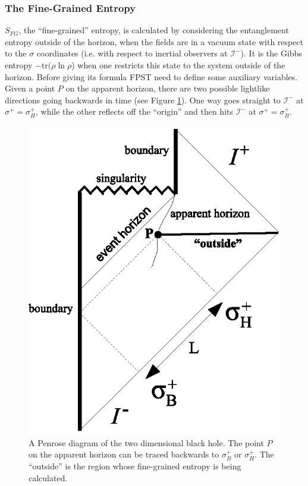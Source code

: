 \documentclass[12pt]{article}
\begin{document}
\subsubsection{The Fine-Grained Entropy}

$S_{FG}$, the ``fine-grained'' entropy, is calculated by considering the entanglement entropy outside of the horizon, when the fields are in a vacuum state with respect to the $\sigma$ coordinates (i.e. with respect to inertial observers at $\mathcal{I}^{-}$).  It is the Gibbs entropy $-\mathrm{tr}(\rho\ln \rho$) when one restricts this state to the system outside of the horizon.  Before giving its formula FPST need to define some auxiliary variables.  Given a point $P$ on the apparent horizon, there are two possible lightlike directions going backwards in time (see Figure \ref{2Dfig}).  One way goes straight to $\mathcal{I}^{-}$ at $\sigma^{+} = \sigma^{+}_H$, while the other reflects off the ``origin'' and then hits $\mathcal{I}^{-}$ at $\sigma^{+} = \sigma^{+}_B$.
\begin{figure}[ht]
\centering
\includegraphics{2d.eps}
\caption{A Penrose diagram of the two dimensional black hole.  The point $P$ on the apparent horizon can be traced backwards to $\sigma^{+}_B$ or $\sigma^{+}_H$.  The ``outside'' is the region whose fine-grained entropy is being calculated.}\label{2Dfig}
\end{figure}
\end{document}
